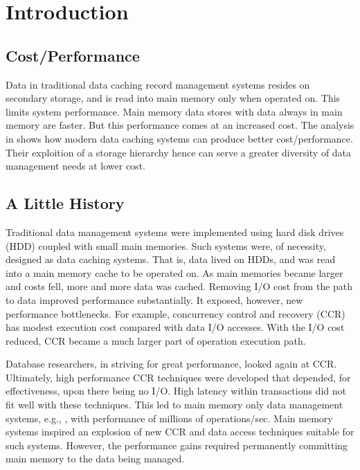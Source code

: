 \documentclass[11pt]{article}
\begin{document}

 


\section{Introduction}

\subsection{Cost/Performance}

Data in traditional data caching record management systems resides on secondary storage, and is read into main memory only when operated on.  This limits system performance.  Main memory data stores with data always in main memory are faster.  But this performance comes at an increased cost.  The analysis in \cite{Damon} shows how modern data caching systems can produce better cost/performance.  Their exploition of a storage hierarchy hence can serve a greater diversity of data management needs at lower cost.


\subsection{A Little History}

Traditional data management systems were implemented using hard disk drives (HDD) coupled with small main memories.  Such systems were, of necessity, designed as data caching systems.  That is, data lived on HDDs, and was read into a main memory cache to be operated on.  As main memories became larger and costs fell, more and more data was cached.  Removing I/O cost from the path to data improved performance substantially.  It exposed, however, new performance bottlenecks.  For example, concurrency control and recovery (CCR) has modest execution cost compared with data I/O accesses.  With the I/O cost reduced, CCR became a much larger part of operation execution path. 

Database researchers, in striving for great performance, looked again at CCR.  Ultimately, high performance CCR techniques were developed that depended, for effectiveness, upon there being no I/O. High latency within transactions did not fit well with these techniques. This led to main memory only data management systems, e.g., \cite{diaconu, hyper13,voltdb}, with performance of millions of operations/sec. Main memory systems inspired an explosion of new CCR and data access techniques suitable for such systems.  However, the performance gains required permanently committing main memory to the data being managed. 
\end{document}
